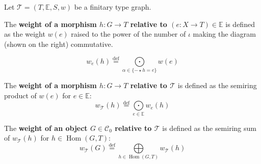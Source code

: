 \begin{definition}
    \label{def:weight}
    Let $\mathcal{T} \mathop{=} (T,\mathbb{E},S, w)$ be a finitary type graph.
    \newline
    \noindent
    \begin{minipage}{0.6\textwidth}
        The \textbf{weight of a morphism $h: G \mathop{\rightarrow} T$ relative to $(e:X \mathop{\to} T) \mathop{\in} \mathbb{E}$} is defined as the weight $w(e)$ raised to the power of the number of $\iota$ making the diagram (shown on the right) commutative.
    \end{minipage}
    \begin{minipage}{0.29\textwidth}
        \begin{center}
        \end{center} 
    \end{minipage}
                \[
                w_e(h) 
                    \overset{\operatorname{def}}{=}
                \underset{\alpha \mathop{\in} \{- \mathop{\star} h \mathop{=} e\}}{\mathop{\bigodot}}w(e) 
                \]

        \noindent
        The \textbf{weight of a morphism $h: G \mathop{\rightarrow} T$ relative to \(\mathcal{T}\)} is defined as the semiring product of $w(e)$ for $e \mathop{\in} \mathbb{E}$:
        \[  w_\mathcal{T}(h) \overset{\operatorname{def}}{=} \underset{e \mathop{\in} \mathbb{E}}{\mathop{\bigodot}} 
                w_e(h) \]

        \noindent
       The \textbf{weight of an object \( G \mathop{\in} \mathcal{C}_0 \) relative to \( \mathcal{T}\)} is defined as the semiring sum of $w_\mathcal{T}(h)$ for $h \mathop{\in} \operatorname{Hom}(G,T)$:
        \[w_\mathcal{T}(G) \overset{\operatorname{def}}{=} \underset{h \mathop{\in} \operatorname{Hom}(G,T)}{\mathop{\bigoplus}}  w_\mathcal{T}(h) \]
\end{definition}


